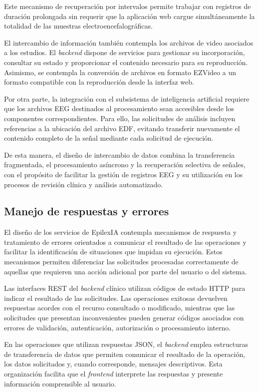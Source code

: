 Este mecanismo de recuperación por intervalos
permite trabajar con registros de duración
prolongada sin requerir que la aplicación
web cargue simultáneamente la totalidad
de las muestras electroencefalográficas.

El intercambio de información también
contempla los archivos de video asociados
a los estudios. El \textit{backend} dispone de
servicios para gestionar su incorporación,
consultar su estado y proporcionar el
contenido necesario para su reproducción.
Asimismo, se contempla la conversión de
archivos en formato EZVideo a un formato
compatible con la reproducción desde
la interfaz web.

Por otra parte, la integración con el
subsistema de inteligencia artificial
requiere que los archivos EEG destinados
al procesamiento sean accesibles desde
los componentes correspondientes. Para
ello, las solicitudes de análisis incluyen
referencias a la ubicación del archivo
EDF, evitando transferir nuevamente
el contenido completo de la señal
mediante cada solicitud de ejecución.

De esta manera, el diseño de intercambio
de datos combina la transferencia
fragmentada, el procesamiento asíncrono
y la recuperación selectiva de señales,
con el propósito de facilitar la
gestión de registros EEG y su
utilización en los procesos de revisión
clínica y análisis automatizado.


\subsection{Manejo de respuestas y errores}
\label{subsec:manejo-respuestas-errores}

El diseño de los servicios de EpilexIA contempla
mecanismos de respuesta y tratamiento de errores
orientados a comunicar el resultado de las operaciones
y facilitar la identificación de situaciones que
impidan su ejecución. Estos mecanismos permiten
diferenciar las solicitudes procesadas correctamente
de aquellas que requieren una acción adicional
por parte del usuario o del sistema.

Las interfaces REST del \textit{backend} clínico utilizan
códigos de estado HTTP para indicar el resultado
de las solicitudes. Las operaciones exitosas
devuelven respuestas acordes con el recurso
consultado o modificado, mientras que las
solicitudes que presentan inconvenientes
pueden generar códigos asociados con errores
de validación, autenticación, autorización
o procesamiento interno.

En las operaciones que utilizan respuestas JSON,
el \textit{backend} emplea estructuras de transferencia
de datos que permiten comunicar el resultado
de la operación, los datos solicitados y,
cuando corresponde, mensajes descriptivos.
Esta organización facilita que el \textit{frontend}
interprete las respuestas y presente información
comprensible al usuario.

